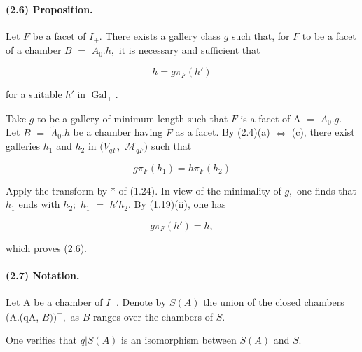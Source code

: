 \documentclass[10pt,a4paper]{article}
\begin{document}
\paragraph{(2.6) Proposition.} Let \ensuremath{F} be a facet of \ensuremath{I_+.} There exists a gallery class \ensuremath{g} such that, for \ensuremath{F} to be a facet of a chamber \ensuremath{B} \ensuremath{=} \ensuremath{\widetilde{A}_0.h,} it is necessary and sufficient that

\[
h = g\pi{}_F(h')
\]

for a suitable \ensuremath{h'} in \ensuremath{\operatorname{Gal}_+.}\par


Take \ensuremath{g} to be a gallery of minimum length such that \ensuremath{F} is a facet of A \ensuremath{=} \ensuremath{\widetilde{A}_0.g.} Let \ensuremath{B} \ensuremath{=} \ensuremath{\widetilde{A}_0.h} be a chamber having \ensuremath{F} as a facet. By (2.4)(a) \ensuremath{\Longleftrightarrow} (c), there exist galleries \ensuremath{h_1} and \ensuremath{h_2} in \ensuremath{(V_{qF},} \ensuremath{\mathcal{M}_{qF})} such that\par

\[
g\pi{}_F(h_1) = h\pi{}_F(h_2)
\]

Apply the transform by * of (1.24). In view of the minimality of \ensuremath{g,} one finds that \ensuremath{h_1} ends with \ensuremath{h_2;} \ensuremath{h_1} \ensuremath{=} \ensuremath{h'h_2.} By (1.19)(ii), one has\par

\[
g\pi{}_F(h') = h,
\]

which proves (2.6).\par

\paragraph{(2.7) Notation.} Let A be a chamber of \ensuremath{I_+.} Denote by \ensuremath{S(A)} the union of the closed chambers (A.(qA, \ensuremath{B))^{-},} as \ensuremath{B} ranges over the chambers of \ensuremath{S.}

One verifies that \ensuremath{q|S(A)} is an isomorphism between \ensuremath{S(A)} and \ensuremath{S.}\par
\end{document}

